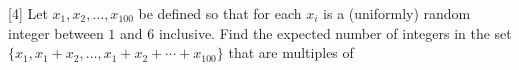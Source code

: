 [4] Let $x_1,x_2,\ldots,x_{100}$ be defined so that for each  $x_i$ is a (uniformly) random integer between $1$ and $6$ inclusive. Find the expected number of integers in the set $\{x_1,x_1+x_2,\ldots,x_1+x_2+\cdots+x_{100}\}$ that are multiples of 